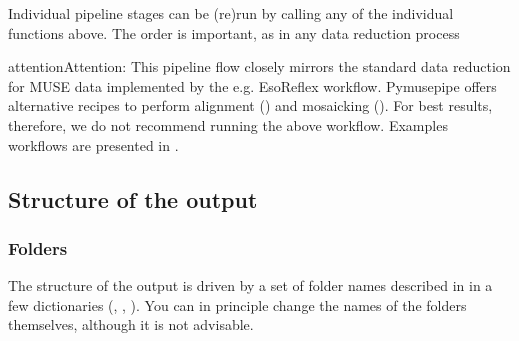 \documentclass[letterpaper,10pt,english]{sphinxmanual}
\begin{document}
\begin{sphinxVerbatim}[commandchars=\\\{\}]
\end{sphinxVerbatim}

\sphinxAtStartPar
Individual pipeline stages can be (re)run by calling any of the individual functions
above. The order is important, as in any data reduction process

\begin{sphinxadmonition}{attention}{Attention:}
\sphinxAtStartPar
This pipeline flow closely mirrors the standard data reduction for MUSE data implemented
by the e.g. EsoReflex workflow. Pymusepipe offers alternative recipes to perform alignment
({\hyperref[\detokenize{alignment::doc}]{}}) and mosaicking ({\hyperref[\detokenize{mosaicking::doc}]{}}). For best results, therefore, we do not
recommend running the above workflow. Examples workflows are presented in {\hyperref[\detokenize{phangs_example::doc}]{}}.
\end{sphinxadmonition}


\subsection{Structure of the output}
\label{\detokenize{getting_started:structure-of-the-output}}

\subsubsection{Folders}
\label{\detokenize{getting_started:folders}}
\sphinxAtStartPar
The structure of the output is driven by a set of folder names described in
{\hyperref[\detokenize{api/pymusepipe:module-pymusepipe.init_musepipe}]{}} in a few dictionaries (,
, ). You can in principle change the names
of the folders themselves, although it is not advisable.
\end{document}
